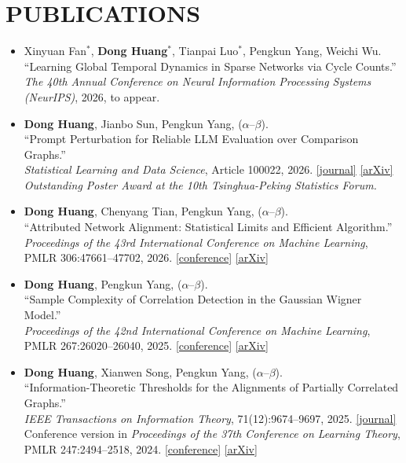 \documentclass[a4paper,10pt]{extarticle}
\newcommand{\me}{\textbf{Dong Huang}}
\newcommand{\alphaorder}{($\alpha$--$\beta$)}
\newcommand{\arxivlink}[1]{\href{https://arxiv.org/abs/#1}{[arXiv]}}
\newcommand{\papertitle}[1]{\textquotedblleft#1\textquotedblright}
\begin{document}
\section*{PUBLICATIONS}
\begin{itemize}
  \item Xinyuan Fan$^{*}$, \me$^{*}$, Tianpai Luo$^{*}$, Pengkun Yang, Weichi Wu.\\
  \papertitle{Learning Global Temporal Dynamics in Sparse Networks via Cycle Counts.}\\
  \textit{The 40th Annual Conference on Neural Information Processing Systems (NeurIPS)}, 2026, to appear.

  \item \me, Jianbo Sun, Pengkun Yang, \alphaorder.\\
  \papertitle{Prompt Perturbation for Reliable LLM Evaluation over Comparison Graphs.}\\
  \textit{Statistical Learning and Data Science}, Article 100022, 2026.
  \href{https://doi.org/10.1016/j.slads.2026.100022}{[journal]}
  \arxivlink{2606.17634}\\
  \textit{Outstanding Poster Award at the 10th Tsinghua-Peking Statistics Forum.}

  \item \me, Chenyang Tian, Pengkun Yang, \alphaorder.\\
  \papertitle{Attributed Network Alignment: Statistical Limits and Efficient Algorithm.}\\
  \textit{Proceedings of the 43rd International Conference on Machine Learning},
  PMLR 306:47661--47702, 2026.
  \mbox{\href{https://proceedings.mlr.press/v306/huang26az.html}{[conference]}}
  \arxivlink{2604.04365}

  \item \me, Pengkun Yang, \alphaorder.\\
  \papertitle{Sample Complexity of Correlation Detection in the Gaussian Wigner Model.}\\
  \textit{Proceedings of the 42nd International Conference on Machine Learning},
  PMLR 267:26020--26040, 2025.
  \mbox{\href{https://proceedings.mlr.press/v267/huang25aq.html}{[conference]}}
  \arxivlink{2505.14138}

  \item \me, Xianwen Song, Pengkun Yang, \alphaorder.\\
  \papertitle{Information-Theoretic Thresholds for the Alignments of Partially Correlated Graphs.}\\
  \textit{IEEE Transactions on Information Theory}, 71(12):9674--9697, 2025.
  \href{https://doi.org/10.1109/TIT.2025.3619813}{[journal]}\\
  Conference version in \textit{Proceedings of the 37th Conference on Learning Theory},
  PMLR 247:2494--2518, 2024.
  \mbox{\href{https://proceedings.mlr.press/v247/huang24b.html}{[conference]}}
  \arxivlink{2406.05428}


\end{itemize}
\end{document}

